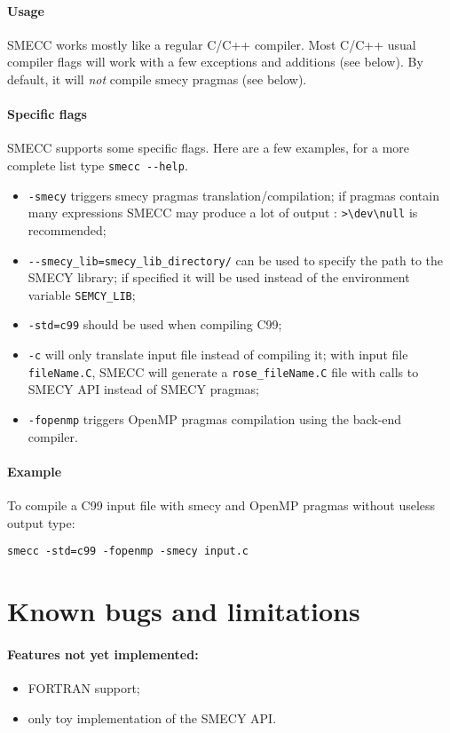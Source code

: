 \documentclass[a4paper,11pt]{article}
\newcommand{\scompiler}{SMECC }
\begin{document}
		\paragraph{Usage}
		\scompiler works mostly like a regular C/C++ compiler. Most C/C++ usual compiler flags will work with a few exceptions and additions (see below). By default, it will \emph{not} compile smecy pragmas (see below).

		\paragraph{Specific flags}
		\scompiler supports some specific flags. Here are a few examples, for a more complete list type \verb+smecc --help+.
		\begin{itemize}
			\item \verb+-smecy+ triggers smecy pragmas translation/compilation; if pragmas contain many expressions \scompiler may produce a lot of output : \verb+>\dev\null+ is recommended;
			\item \verb+--smecy_lib=smecy_lib_directory/+ can be used to specify the path to the SMECY library; if specified it will be used instead of the environment variable \verb+SEMCY_LIB+;
			\item \verb+-std=c99+ should be used when compiling C99;
			\item \verb+-c+ will only translate input file instead of compiling it; with input file \verb+fileName.C+, \scompiler will generate a \verb+rose_fileName.C+ file with calls to SMECY API instead of SMECY pragmas;
			\item \verb+-fopenmp+ triggers OpenMP pragmas compilation using the back-end compiler.
		\end{itemize}

		\paragraph{Example} To compile a C99 input file with smecy and OpenMP pragmas without useless output type:
\begin{verbatim}
smecc -std=c99 -fopenmp -smecy input.c
\end{verbatim}

	\section{Known bugs and limitations}

		\paragraph{Features not yet implemented:}
		\begin{itemize}
			\item FORTRAN support;
			\item only toy implementation of the SMECY API.
		\end{itemize}
\end{document}

